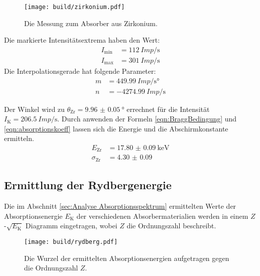     \begin{figure}[H]
      \centering
      \texttt{[image: build/zirkonium.pdf]}
      \caption{Die Messung zum Absorber aus Zirkonium.}
      \label{fig:zirkonium}
    \end{figure}

    \noindent Die markierte Intensitätsextrema haben den Wert:
    \begin{align*}
      I_{\text{min}} &= \SI{112}{Imp\per\second}\\
      I_{\text{max}} &= \SI{301}{Imp\per\second}
    \end{align*}
    Die Interpolationsgerade hat folgende Parameter:
    \begin{align*}
      m & = \SI{449.99}{Imp\per\second\degree}\\
      n & = \SI{-4274.99}{Imp\per\second}
    \end{align*}

    \noindent Der Winkel wird zu $\theta_{\text{Zr}} = \SI{9.96(5)}{\degree}$ errechnet für die Intensität $I_{\text{K}} = \SI{206.5}{Imp\per\second}$. Durch anwenden der Formeln \eqref{eqn:BraggBedingung} und \eqref{eqn:absorptionskoeff}
    lassen sich die Energie und die Abschirmkonstante ermitteln.
    \begin{align*}
      E_{\text{Zr}} &= \SI{17.80(9)}{\kilo\electronvolt}\\
      \sigma_{\text{Zr}} &= \num{4.30(9)}
    \end{align*} 



\subsection{Ermittlung der Rydbergenergie}

  Die im Abschnitt \ref{sec:Analyse Absorptionsspektrum} ermittelten Werte der Absorptionsenergie $E_{\text{K}}$ der verschiedenen Absorbermaterialien werden
  in  einem $Z$-$\sqrt{E_{\text{K}}}$ Diagramm eingetragen, wobei $Z$ die Ordnungszahl beschreibt.

  \begin{figure}[H]
    \centering
    \texttt{[image: build/rydberg.pdf]}
    \caption{Die Wurzel der ermittelten Absorptionsenergien aufgetragen gegen die Ordnungszahl $Z$.}
    \label{fig:rydberg}
  \end{figure}

